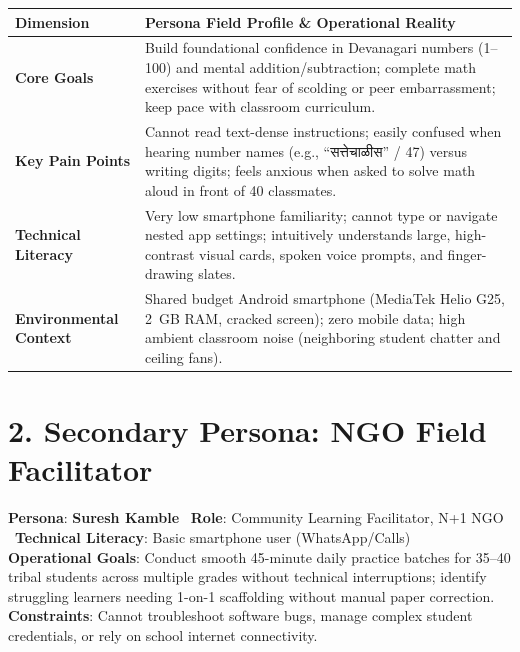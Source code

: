 \documentclass[10pt,a4paper]{article}
\begin{document}
\vspace{-3pt}
\begin{table}[h!]
\centering
\scriptsize
\renewcommand{\arraystretch}{1.15}
\begin{tabularx}{\textwidth}{@{}p{3.0cm} X@{}}
\toprule
\rowcolor{secondary!10}
\textbf{Dimension} & \textbf{Persona Field Profile \& Operational Reality} \\
\midrule
\textbf{Core Goals} & Build foundational confidence in Devanagari numbers (1--100) and mental addition/subtraction; complete math exercises without fear of scolding or peer embarrassment; keep pace with classroom curriculum. \\
\textbf{Key Pain Points} & Cannot read text-dense instructions; easily confused when hearing number names (e.g., ``सत्तेचाळीस'' / 47) versus writing digits; feels anxious when asked to solve math aloud in front of 40 classmates. \\
\textbf{Technical Literacy} & Very low smartphone familiarity; cannot type or navigate nested app settings; intuitively understands large, high-contrast visual cards, spoken voice prompts, and finger-drawing slates. \\
\textbf{Environmental Context} & Shared budget Android smartphone (MediaTek Helio G25, 2~GB RAM, cracked screen); zero mobile data; high ambient classroom noise (neighboring student chatter and ceiling fans). \\
\bottomrule
\end{tabularx}
\end{table}

\vspace{-4pt}
\section*{2. Secondary Persona: NGO Field Facilitator}
\begin{tcolorbox}[colback=white,colframe=primary,boxrule=0.6pt,arc=2pt,left=5pt,right=5pt,top=2pt,bottom=2pt]
\scriptsize
\textbf{Persona}: \textbf{Suresh Kamble} \textbar\ \textbf{Role}: Community Learning Facilitator, N+1 NGO \textbar\ \textbf{Technical Literacy}: Basic smartphone user (WhatsApp/Calls) \\
\textbf{Operational Goals}: Conduct smooth 45-minute daily practice batches for 35--40 tribal students across multiple grades without technical interruptions; identify struggling learners needing 1-on-1 scaffolding without manual paper correction. \\
\textbf{Constraints}: Cannot troubleshoot software bugs, manage complex student credentials, or rely on school internet connectivity.
\end{tcolorbox}
\end{document}
